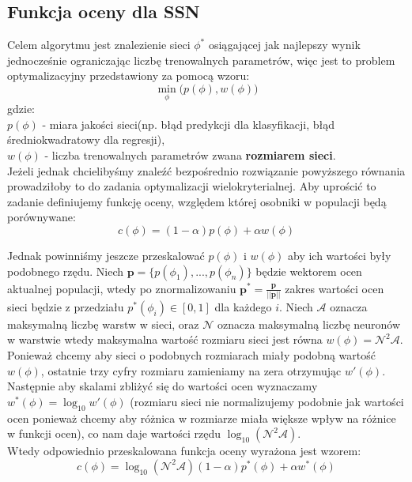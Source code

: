 \documentclass{article}
\renewcommand{\vec}[1]{\mathbf{#1}}
\begin{document}
\subsection{Funkcja oceny dla SSN}
\label{sec:ocena}
Celem algorytmu jest znalezienie sieci $\phi^{*}$ osiągającej jak najlepszy wynik jednocześnie
ograniczając liczbę trenowalnych parametrów, więc jest to problem optymalizacyjny 
przedstawiony za pomocą wzoru:
\begin{equation}
	\underset{\phi}{\min}\big(p(\phi), w(\phi)\big)
\end{equation}
gdzie:\\
$p(\phi)$ - miara jakości sieci(np. błąd predykcji dla klasyfikacji, błąd średniokwadratowy dla regresji),\\
$w(\phi)$ - liczba trenowalnych parametrów zwana \textbf{rozmiarem sieci}.\\
Jeżeli jednak chcielibyśmy znaleźć bezpośrednio rozwiązanie powyższego równania
prowadziłoby to do zadania optymalizacji wielokryterialnej. Aby uprościć to zadanie
definiujemy funkcję oceny, względem której osobniki w populacji będą porównywane:
\begin{equation}
	c(\phi) = (1 - \alpha)p(\phi) + \alpha w(\phi)
\end{equation}

Jednak powinniśmy jeszcze przeskalować $p(\phi)$ i $w(\phi)$ aby ich wartości były podobnego 
rzędu. Niech $\vec{p} = \{p(\phi_1), ..., p(\phi_n)\}$ będzie wektorem ocen aktualnej populacji,
wtedy po znormalizowaniu $\vec{p}^{*} = \frac{\vec{p}}{||\vec{p}||}$ zakres wartości ocen sieci
będzie z przedziału $p^{*}(\phi_i) \in [0, 1]$ dla każdego $i$. Niech $\mathcal{A}$ oznacza
maksymalną liczbę warstw w sieci, oraz $\mathcal{N}$ oznacza maksymalną liczbę neuronów w 
warstwie wtedy maksymalna wartość rozmiaru sieci jest równa $w(\phi) = \mathcal{N}^2\mathcal{A}$.
Ponieważ chcemy aby sieci o podobnych rozmiarach miały podobną wartość $w(\phi)$,
ostatnie trzy cyfry rozmiaru zamieniamy na zera otrzymując $w'(\phi)$.
Następnie aby skalami zbliżyć się do 
wartości ocen  wyznaczamy $w^{*}(\phi) = \log_{10}w'(\phi)$ (rozmiaru sieci
nie normalizujemy podobnie jak wartości ocen ponieważ chcemy aby różnica w rozmiarze
miała większe wpływ na różnice w funkcji ocen), co nam daje wartości
rzędu $\log_{10}(\mathcal{N}^2\mathcal{A})$.\\
Wtedy odpowiednio przeskalowana funkcja oceny wyrażona jest wzorem:
\begin{equation}
	c(\phi) = \log_{10}(\mathcal{N}^2\mathcal{A})(1 - \alpha)p^{*}(\phi) + \alpha w^{*}(\phi)
\end{equation}
\end{document}
